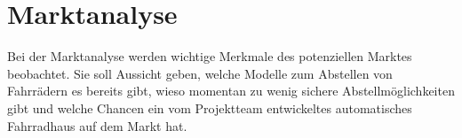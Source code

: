 \section{Marktanalyse}
Bei der Marktanalyse werden wichtige Merkmale des potenziellen Marktes beobachtet. Sie soll Aussicht geben, welche Modelle zum Abstellen von Fahrrädern es bereits gibt, wieso momentan zu wenig sichere Abstellmöglichkeiten gibt und welche Chancen ein vom Projektteam entwickeltes automatisches Fahrradhaus auf dem Markt hat.













